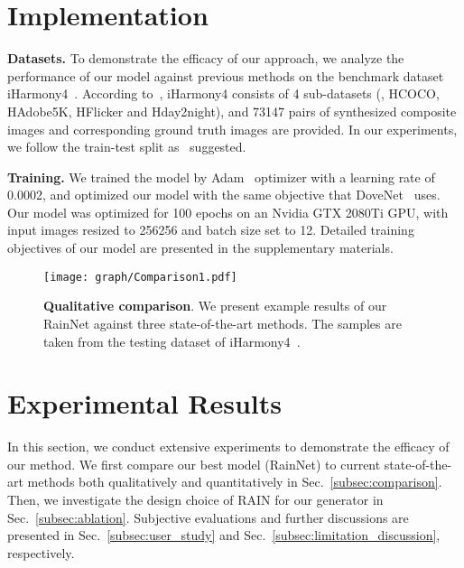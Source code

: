 \documentclass[final]{cvpr}
\begin{document}
\section{Implementation}
\label{sec:implementation}

\noindent
\textbf{Datasets.} To demonstrate the efficacy of our approach, we analyze the performance of our model against previous methods on the benchmark dataset iHarmony4~\cite{cong2020dovenet}. According to~\cite{cong2020dovenet}, iHarmony4 consists of 4 sub-datasets (\ie, HCOCO, HAdobe5K, HFlicker and Hday2night), and 73147 pairs of synthesized composite images and corresponding ground truth images are provided. In our experiments, we follow the train-test split as~\cite{cong2020dovenet} suggested. 

\noindent
\textbf{Training.} We trained the model by Adam~\cite{kingma2014adam} optimizer with a learning rate of 0.0002, and optimized our model with the same objective that DoveNet~\cite{cong2020dovenet} uses. Our model was optimized for 100 epochs on an Nvidia GTX 2080Ti GPU, with input images resized to 256256 and batch size set to 12. Detailed training objectives of our model are presented in the supplementary materials. 




\begin{figure*}[!htbp]
\begin{center}
\texttt{[image: graph/Comparison1.pdf]}
\end{center}
   \caption{\textbf{Qualitative comparison}. We present example results of our RainNet against three state-of-the-art methods. The samples are taken from the testing dataset of iHarmony4~\cite{cong2020dovenet}. }
   \label{fig:comparison1}
\end{figure*}

\section{Experimental Results}
\label{sec:results}
In this section, we conduct extensive experiments to demonstrate the efficacy of our method. We first compare our best model (RainNet) to current state-of-the-art methods both qualitatively and quantitatively in Sec.~\ref{subsec:comparison}. Then, we investigate the design choice of RAIN for our generator in Sec.~\ref{subsec:ablation}. Subjective evaluations and further discussions are presented in Sec.~\ref{subsec:user_study} and Sec.~\ref{subsec:limitation_discussion}, respectively.
\end{document}
